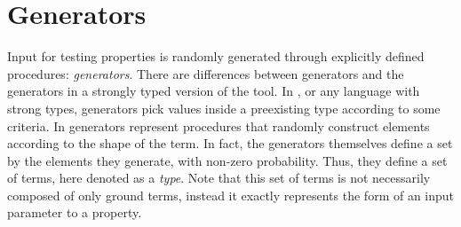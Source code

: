 


\section{Generators}
\label{sec:generators}

Input for testing properties is randomly generated through explicitly
defined procedures: \emph{generators}.
%
There are  differences between \plqc{} generators and the
generators in a strongly typed version of the tool.
%
In \Haskell{} \QuickCheck{}, or any language with strong types,
generators pick values inside a preexisting type according to some criteria.
%
In \plqc{} generators represent procedures that randomly construct
elements according to the shape of the term.
%
In fact, the generators themselves define 
a set by the elements
they generate, with non-zero probability.
%
Thus, they define a set of terms, here denoted as a \emph{type}.
%
Note that this set of terms is not necessarily composed of only ground
terms, instead it exactly represents the form of an input parameter to a
property.



